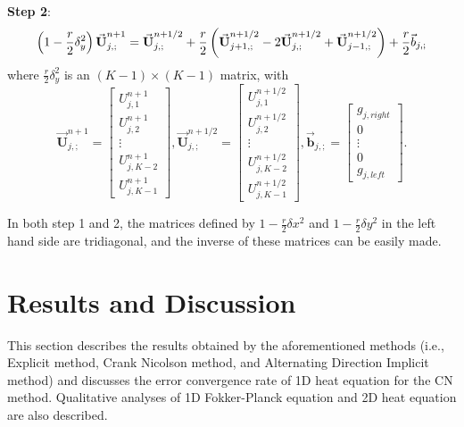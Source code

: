\documentclass[12pt]{article}		%
\begin{document}
\textbf{Step 2}:
\begin{equation*}
	\left(1- \frac{r}{2}\delta^2_y \right) \vec{\textbf{U}}_{j,;}^{n+1} = \vec{\textbf{U}}_{j,;}^{n+1/2} + \frac{r}{2} \left(\vec{\textbf{U}}_{j+1,;}^{n+1/2} - 2 \vec {\textbf{U}}_{j,;}^{n+1/2} + \vec{\textbf{U}}_{j-1,;}^{n+1/2} \right) + \frac{r}{2} \vec{b}_{j,;} \\
\end{equation*}
where $\frac{r}{2} \delta_y^2$ is an $(K-1)\times (K-1)$ matrix, with 
\begin{equation*}
	\vec{\textbf{U}}^{n+1}_{j,;} = \begin{bmatrix} U^{n+1}_{j,1} \\ U^{n+1}_{j,2} \\ \vdots \\ U^{n+1}_{j,K-2} \\ U^{n+1}_{j,K-1} \end{bmatrix}, 
	\vec{\textbf{U}}_{j,;}^{n+1/2} = \begin{bmatrix} U_{j,1}^{n+1/2} \\ U_{j,2}^{n+1/2} \\ \vdots \\ U_{j,K-2}^{n+1/2} \\ U_{j,K-1}^{n+1/2} \end{bmatrix}, 
	\vec{\textbf{b}}_{j,;} = \begin{bmatrix} g_{j, right} \\ 0 \\ \vdots \\ 0 \\ g_{j, left} \end{bmatrix}.
\end{equation*} 

In both step 1 and 2, the matrices defined by $1-\frac{r}{2} \delta x^2$ and $1-\frac{r}{2} \delta y^2$ in the left hand side are tridiagonal, and the inverse of these matrices can be easily made.

\newpage
\section*{Results and Discussion}
This section describes the results obtained by the aforementioned methods (i.e., Explicit method, Crank Nicolson method, and Alternating Direction Implicit method) and discusses the error convergence rate of 1D heat equation for the CN method. Qualitative analyses of 1D Fokker-Planck equation and  2D heat equation are also described.
\end{document}
